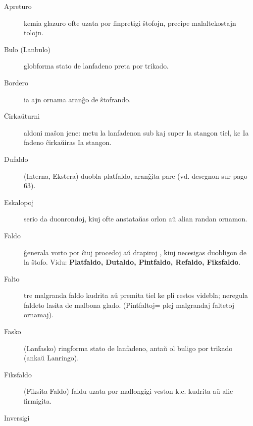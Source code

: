 \begin{description}
\item[Apreturo]

 kemia glazuro ofte uzata por finpretigi ŝtofojn, precipe malaltekostajn tolojn.

\item[Bulo (Lanbulo)]

 globforma stato de lanfadeno preta por trikado.

\item[Bordero]

 ia ajn ornama aranĝo de ŝtofrando.

\item[Ĉirkaŭturni]

 aldoni maŝon jene: metu la lanfadenon sub kaj super la stangon tiel, ke Ia fadeno ĉirkaŭiras Ia stangon.

\item[Dufaldo]

(Interna, Ekstera) duobla platfaldo, aranĝita pare (vd. desegnon sur pago 63).

\item[\ast\space Eskalopoj]

 serio da duonrondoj, kiuj ofte anstataŭas orlon aŭ alian randan ornamon.

\item[Faldo]

 ĝenerala vorto por ĉiuj procedoj aŭ drapiroj , kiuj necesigas duobligon de la ŝtofo. Vidu: \textbf{Platfaldo, Dutaldo, Pintfaldo, Refaldo, Fiksfaldo}.

\item[Falto]

 tre malgranda faldo kudrita aŭ premita tiel ke pli restos videbla; neregula faldeto lasita de malbona glado. (Pintfaltoj= plej malgrandaj faltetoj ornamaj).

\item[Fasko]

 (Lanfasko) ringforma stato de lanfadeno, antaŭ ol buligo por trikado (ankaŭ Lanringo).

\item[Fiksfaldo]

 (Fiksita Faldo) faldu uzata por mallongigi veston k.c. kudrita aŭ alie firmigita.

\item[Inversigi]


\end{description}
